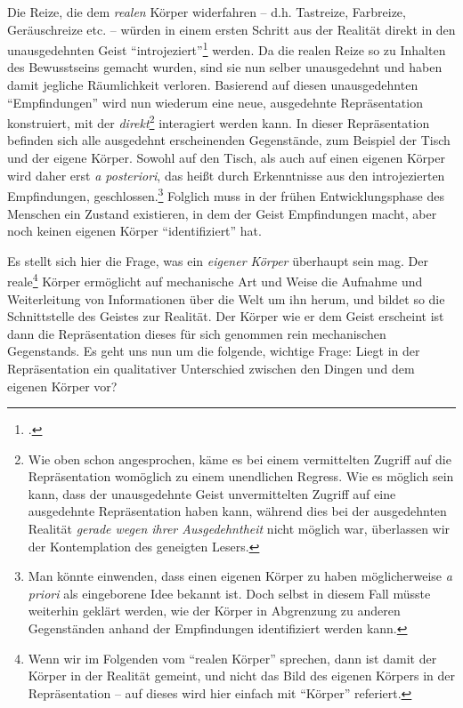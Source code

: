 \documentclass[a4paper, 12pt]{article}
\begin{document}
\begin{onehalfspace}
Die Reize, die dem \emph{realen} Körper widerfahren -- d.h. Tastreize, Farbreize, Geräuschreize etc. -- würden in einem ersten Schritt aus der Realität direkt in den unausgedehnten Geist "`introjeziert"'\footnote{\Cite[Vgl.][S. 497]{scheler-ethik}.} werden. Da die realen Reize so zu Inhalten des Bewusstseins gemacht wurden, sind sie nun selber unausgedehnt und haben damit jegliche Räumlichkeit verloren. Basierend auf diesen unausgedehnten "`Empfindungen"' wird nun wiederum eine neue, ausgedehnte Repräsentation konstruiert, mit der \emph{direkt}\footnote{Wie oben schon angesprochen, käme es bei einem vermittelten Zugriff auf die Repräsentation womöglich zu einem unendlichen Regress. Wie es möglich sein kann, dass der unausgedehnte Geist unvermittelten Zugriff auf eine ausgedehnte Repräsentation haben kann, während dies bei der ausgedehnten Realität \emph{gerade wegen ihrer Ausgedehntheit} nicht möglich war, überlassen wir der Kontemplation des geneigten Lesers.} interagiert werden kann. In dieser Repräsentation befinden sich alle ausgedehnt erscheinenden Gegenstände, zum Beispiel der Tisch und der eigene Körper. Sowohl auf den Tisch, als auch auf einen eigenen Körper wird daher erst \emph{a posteriori}, das heißt durch Erkenntnisse aus den introjezierten Empfindungen, geschlossen.\footnote{Man könnte einwenden, dass einen eigenen Körper zu haben möglicherweise \emph{a priori} als eingeborene Idee bekannt ist. Doch selbst in diesem Fall müsste weiterhin geklärt werden, wie der Körper in Abgrenzung zu anderen Gegenständen anhand der Empfindungen identifiziert werden kann.} Folglich muss in der frühen Entwicklungsphase des Menschen ein Zustand existieren, in dem der Geist Empfindungen macht, aber noch keinen eigenen Körper "`identifiziert"' hat.

Es stellt sich hier die Frage, was ein \emph{eigener Körper} überhaupt sein mag. Der reale\footnote{Wenn wir im Folgenden vom "`realen Körper"' sprechen, dann ist damit der Körper in der Realität gemeint, und nicht das Bild des eigenen Körpers in der Repräsentation -- auf dieses wird hier einfach mit "`Körper"' referiert.} Körper ermöglicht auf mechanische Art und Weise die Aufnahme und Weiterleitung von Informationen über die Welt um ihn herum, und bildet so die Schnittstelle des Geistes zur Realität. Der Körper wie er dem Geist erscheint ist dann die Repräsentation dieses für sich genommen rein mechanischen Gegenstands. Es geht uns nun um die folgende, wichtige Frage: Liegt in der Repräsentation ein qualitativer Unterschied zwischen den Dingen und dem eigenen Körper vor?


\end{onehalfspace}
\end{document}
